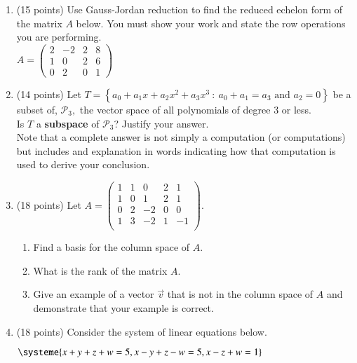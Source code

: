 \documentclass[12pt]{article}
\renewcommand{\emph}[1]{\textsf{\textbf{#1}}}
\newcommand{\bpm}{\begin{pmatrix}}
\newcommand{\epm}{\end{pmatrix}}
\begin{document}
\newpage
\begin{enumerate}
\item (15 points) Use Gauss-Jordan reduction to find the reduced echelon form of the matrix $A$ below. You must show your work and state the row operations you are performing.\\

$A=\bpm 2&-2&2&8\\1&0&2&6\\0&2&0&1 \epm$

\newpage
\item (14 points) Let $\displaystyle T=\left\{ a_0+a_1x+a_2x^2+a_3x^3 \: : \: a_0+a_1=a_3 \text{ and } a_2=0 \right\}$ be a subset of, $\mathcal{P}_3,$ the vector space of all polynomials of degree 3 or less.\\

Is $T$ a \emph{subspace} of $\mathcal{P}_3$? Justify your answer.\\

Note that a complete answer is not simply a computation (or computations) but includes and explanation in words indicating how that computation is used to derive your conclusion.\\

\newpage

\item (18 points) Let $A= \bpm 1&1&0&2&1\\1&0&1&2&1\\0&2&-2&0&0\\1&3&-2&1&-1\\ \epm.$\\
	\begin{enumerate}
	\item Find a basis for the column space of $A$.
	\vfill
	\item What is the rank of the matrix $A.$
	\vspace{.5in}
	\item Give an example of a vector $\vec{v}$ that is not in the column space of $A$ and demonstrate that your example is correct.
	\vspace{2in}
	\end{enumerate}
\newpage
\item (18 points) Consider the system of linear equations below.
\begin{center} $\systeme{x+y+z+w=5,x-y+z-w=5,x-z+w=1}$ \end{center}


\end{enumerate}
\end{document}

